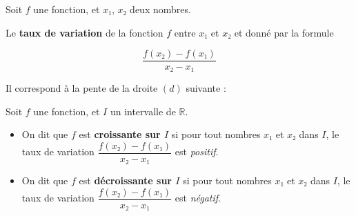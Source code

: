 \documentclass[
	classe=$1^{ere}$STI2D
]{coursclass}
\begin{document}
\begin{definition}
	Soit $f$ une fonction, et $x₁$, $x₂$ deux nombres.

	Le \textbf{taux de variation} de la fonction $f$ entre $x₁$ et $x₂$ et donné par la formule

	$$ \dfrac{f(x₂) - f(x₁)}{x₂ - x₁} $$

	Il correspond à la pente de la droite $(d)$ suivante :

	\begin{center}
	\end{center}
\end{definition}

\begin{definition}
	Soit $f$ une fonction, et $I$ un intervalle de $ℝ$.

	\begin{itemize}
		\item On dit que $f$ est \textbf{croissante sur $I$} si pour tout nombres $x₁$ et $x₂$ dans $I$, le taux de variation $\dfrac{f(x₂) - f(x₁)}{x₂ - x₁}$ est \textit{positif}.
		\item On dit que $f$ est \textbf{décroissante sur $I$} si pour tout nombres $x₁$ et $x₂$ dans $I$, le taux de variation $\dfrac{f(x₂) - f(x₁)}{x₂ - x₁}$ est \textit{négatif}.
	\end{itemize}
\end{definition}
\end{document}
